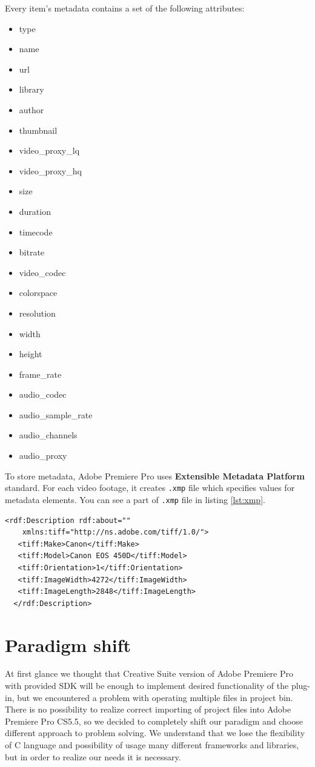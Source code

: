 \documentclass[thesis=B,english]{FITthesis}[2012/10/20]
\begin{document}
Every item's metadata contains a set of the following attributes:
	\begin{itemize}
		\item type
		\item name
		\item url
		\item library
		\item author
		\item thumbnail
		\item video\_proxy\_lq
		\item video\_proxy\_hq
		\item size
		\item duration
		\item timecode
		\item bitrate
		\item video\_codec
		\item colorspace
		\item resolution
		\item width
		\item height
		\item frame\_rate
		\item audio\_codec
		\item audio\_sample\_rate
		\item audio\_channels
		\item audio\_proxy
	\end{itemize}
To store metadata, Adobe Premiere Pro uses \textbf{Extensible Metadata Platform} standard. For each video footage, it creates \texttt{.xmp} file which specifies values for metadata elements. You can see a part of \texttt{.xmp} file in listing \ref{lst:xmp}.
\begin{lstlisting}[caption=Part of XMP file, label=lst:xmp]
<rdf:Description rdf:about=""
    xmlns:tiff="http://ns.adobe.com/tiff/1.0/">
   <tiff:Make>Canon</tiff:Make>
   <tiff:Model>Canon EOS 450D</tiff:Model>
   <tiff:Orientation>1</tiff:Orientation>
   <tiff:ImageWidth>4272</tiff:ImageWidth>
   <tiff:ImageLength>2848</tiff:ImageLength>
  </rdf:Description>
\end{lstlisting}
\chapter{Paradigm shift}
At first glance we thought that Creative Suite version of Adobe Premiere Pro with provided SDK will be enough to implement desired functionality of the plug-in, but we encountered a problem with operating multiple files in project bin. There is no possibility to realize correct importing of project files into Adobe Premiere Pro CS5.5, so we decided to completely shift our paradigm and choose different approach to problem solving. We understand that we lose the flexibility of C language and possibility of usage many different frameworks and libraries, but in order to realize our needs it is necessary.
\end{document}
